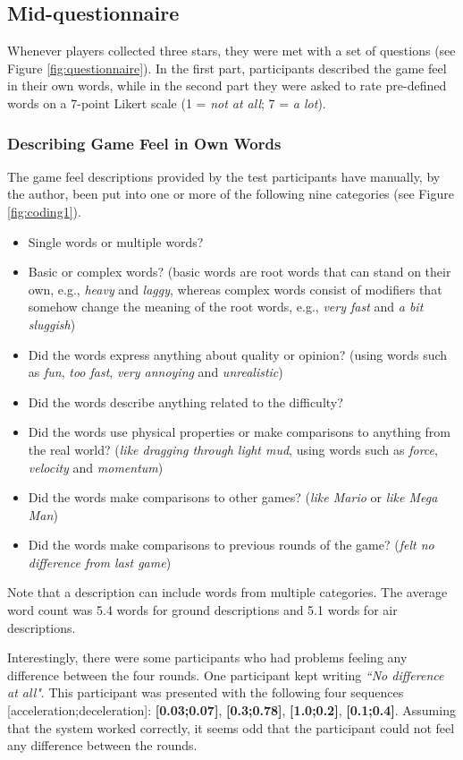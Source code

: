 \subsection{Mid-questionnaire}
Whenever players collected three stars, they were met with a set of questions (see Figure \ref{fig:questionnaire}). In the first part, participants described the game feel in their own words, while in the second part they were asked to rate pre-defined words on a 7-point Likert scale (1 = \textit{not at all}; 7 = \textit{a lot}).

\subsubsection{Describing Game Feel in Own Words}
The game feel descriptions provided by the test participants have manually, by the author, been put into one or more of the following nine categories (see Figure \ref{fig:coding1}).
\begin{itemize}[noitemsep,nolistsep]
\item Single words or multiple words?
\item Basic or complex words? (basic words are root words that can stand on their own, e.g., \textit{heavy} and \textit{laggy}, whereas complex words consist of modifiers that somehow change the meaning of the root words, e.g., \textit{very fast} and \textit{a bit sluggish})
\item Did the words express anything about quality or opinion? (using words such as \textit{fun}, \textit{too fast}, \textit{very annoying} and \textit{unrealistic})
\item Did the words describe anything related to the difficulty?
\item Did the words use physical properties or make comparisons to anything from the real world? (\textit{like dragging through light mud}, using words such as \textit{force}, \textit{velocity} and \textit{momentum})
\item Did the words make comparisons to other games? (\textit{like Mario} or \textit{like Mega Man})
\item Did the words make comparisons to previous rounds of the game? (\textit{felt no difference from last game})
\end{itemize}

Note that a description can include words from multiple categories. The average word count was 5.4 words for ground descriptions and 5.1 words for air descriptions.

Interestingly, there were some participants who had problems feeling any difference between the four rounds. One participant kept writing \textit{``No difference at all"}. This participant was presented with the following four sequences [acceleration;deceleration]: \textbf{[0.03;0.07]}, \textbf{[0.3;0.78]}, \textbf{[1.0;0.2]}, \textbf{[0.1;0.4]}. Assuming that the system worked correctly, it seems odd that the participant could not feel any difference between the rounds.

